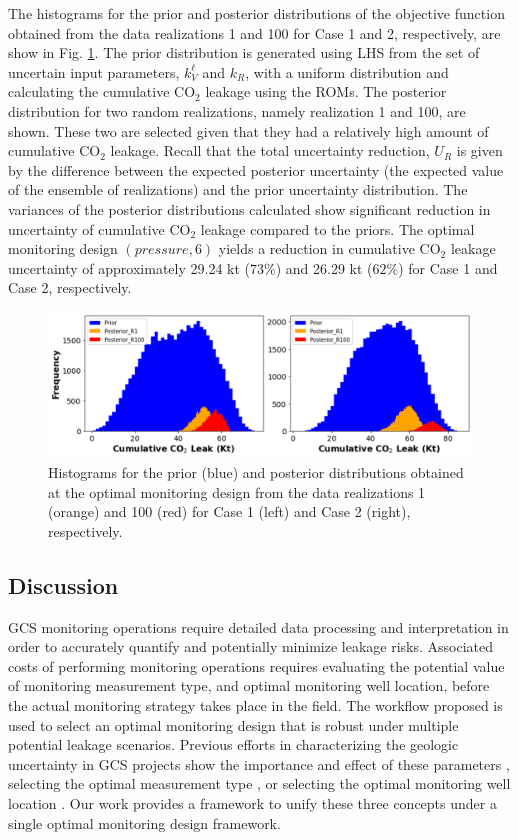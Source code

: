 \documentclass[a4paper,fleqn]{cas-sc}
\begin{document}
The histograms for the prior and posterior distributions of the objective function obtained from the data realizations 1 and 100 for Case 1 and 2, respectively, are show in Fig. \ref{ur_dist}. The prior distribution is generated using LHS from the set of uncertain input parameters, $k_V^\ell$ and $k_R$, with a uniform distribution and calculating the cumulative CO$_2$ leakage using the ROMs. The posterior distribution for two random realizations, namely realization 1 and 100, are shown. These two are selected given that they had a relatively high amount of cumulative CO$_2$ leakage. Recall that the total uncertainty reduction, $U_R$ is given by the difference between the expected posterior uncertainty (the expected value of the ensemble of realizations) and the prior uncertainty distribution. The variances of the posterior distributions calculated show significant reduction in uncertainty of cumulative CO$_2$ leakage compared to the priors. The optimal monitoring design $(pressure, 6)$ yields a reduction in cumulative CO$_2$ leakage uncertainty of approximately 29.24 kt ($73\%$) and 26.29 kt ($62\%$) for Case 1 and Case 2, respectively. 

\begin{figure}
    \centering
    \includegraphics[width=16cm]{figs/Figure 12.pdf}
    \caption{Histograms for the prior (blue) and posterior distributions obtained at the optimal monitoring design from the data realizations 1 (orange) and 100 (red) for Case 1 (left) and Case 2 (right), respectively.}
    \label{ur_dist}
\end{figure}

\subsection{Discussion}
GCS monitoring operations require detailed data processing and interpretation in order to accurately quantify and potentially minimize leakage risks. Associated costs of performing monitoring operations requires evaluating the potential value of monitoring measurement type, and optimal monitoring well location, before the actual monitoring strategy takes place in the field. The workflow proposed is used to select an optimal monitoring design that is robust under multiple potential leakage scenarios. Previous efforts in characterizing the geologic uncertainty in GCS projects show the importance and effect of these parameters \citep{Jia2018104, Chen2020, Pawar2022}, selecting the optimal measurement type \citep{Yonkofski2016, Oladyshkin2013671}, or selecting the optimal monitoring well location \citep{Sun2013, Sun2019}. Our work provides a framework to unify these three concepts under a single optimal monitoring design framework.
\end{document}
